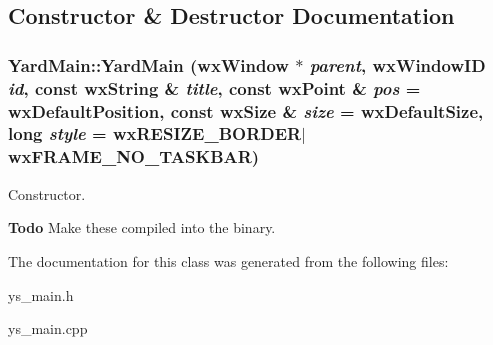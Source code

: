 \subsection{Constructor \& Destructor Documentation}
\subsubsection{\setlength{\rightskip}{0pt plus 5cm}Yard\-Main::Yard\-Main (wx\-Window $\ast$ {\em parent}, wx\-Window\-ID {\em id}, const wx\-String \& {\em title}, const wx\-Point \& {\em pos} = wx\-Default\-Position, const wx\-Size \& {\em size} = wx\-Default\-Size, long {\em style} = wx\-RESIZE\_\-BORDER$|$wx\-FRAME\_\-NO\_\-TASKBAR)}\label{classYardMain_a0}


Constructor. 



\begin{Desc}
\item[{\bf Todo}]Make these compiled into the binary.\end{Desc}


The documentation for this class was generated from the following files:\begin{CompactItemize}
\item 
ys\_\-main.h\item 
ys\_\-main.cpp\end{CompactItemize}
